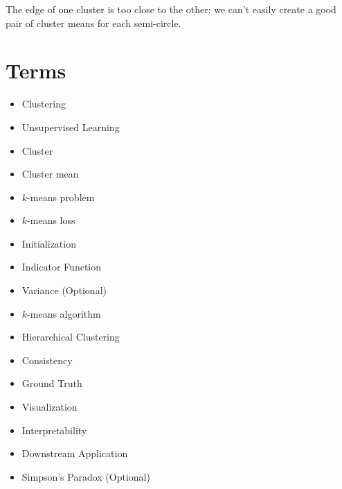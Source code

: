         The edge of one cluster is too close to the other: we can't easily create a good pair of cluster means for each semi-circle.
        
\section{Terms}

    \begin{itemize}
        \item Clustering
        \item Unsupervised Learning
        \item Cluster
        \item Cluster mean
        \item $k$-means problem
        \item $k$-means loss
        \item Initialization
        \item Indicator Function
        \item Variance (Optional)
        \item $k$-means algorithm
        \item Hierarchical Clustering
        \item Consistency
        \item Ground Truth
        \item Visualization
        \item Interpretability
        \item Downstream Application
        \item Simpson's Paradox (Optional)
    \end{itemize}
    
    


 